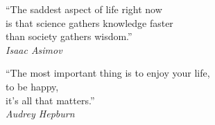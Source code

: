 
\null\vfill

\begin{center}
    ``The saddest aspect of life right now\\ 
    is that science gathers knowledge faster\\
    than society gathers wisdom.''\\
    \textit{Isaac Asimov}
\end{center}

\vspace{2cm}

\begin{center}
    ``The most important thing is to enjoy your life,\\ 
    to be happy,\\
    it's all that matters.''\\
    \textit{Audrey Hepburn}
\end{center}

\vfill
